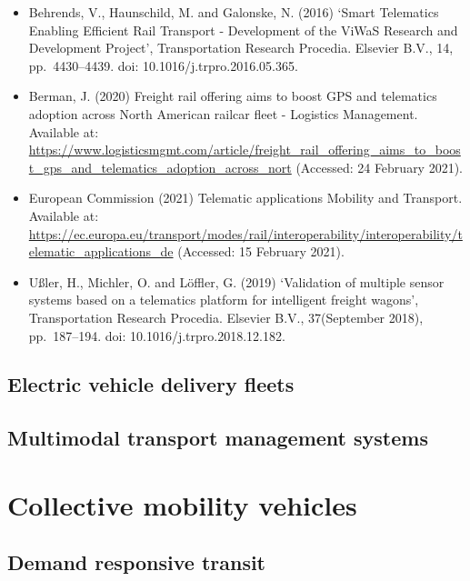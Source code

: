 \documentclass[
]{book}
\providecommand{\tightlist}{%
  \setlength{\itemsep}{0pt}\setlength{\parskip}{0pt}}
\begin{document}
\begin{itemize}
\tightlist
\item
  Behrends, V., Haunschild, M. and Galonske, N. (2016) `Smart Telematics Enabling Efficient Rail Transport - Development of the ViWaS Research and Development Project', Transportation Research Procedia. Elsevier B.V., 14, pp.~4430--4439. doi: 10.1016/j.trpro.2016.05.365.
\item
  Berman, J. (2020) Freight rail offering aims to boost GPS and telematics adoption across North American railcar fleet - Logistics Management. Available at: \url{https://www.logisticsmgmt.com/article/freight_rail_offering_aims_to_boost_gps_and_telematics_adoption_across_nort} (Accessed: 24 February 2021).
\item
  European Commission (2021) Telematic applications \textbar{} Mobility and Transport. Available at: \url{https://ec.europa.eu/transport/modes/rail/interoperability/interoperability/telematic_applications_de} (Accessed: 15 February 2021).
\item
  Ußler, H., Michler, O. and Löffler, G. (2019) `Validation of multiple sensor systems based on a telematics platform for intelligent freight wagons', Transportation Research Procedia. Elsevier B.V., 37(September 2018), pp.~187--194. doi: 10.1016/j.trpro.2018.12.182.
\end{itemize}

\hypertarget{electric-vehicle-delivery-fleets}{%
\section{Electric vehicle delivery fleets}\label{electric-vehicle-delivery-fleets}}

\hypertarget{multimodal-transport-management-systems}{%
\section{Multimodal transport management systems}\label{multimodal-transport-management-systems}}

\hypertarget{collective}{%
\chapter{Collective mobility vehicles}\label{collective}}

\hypertarget{demand-responsive-transit}{%
\section{Demand responsive transit}\label{demand-responsive-transit}}
\end{document}
